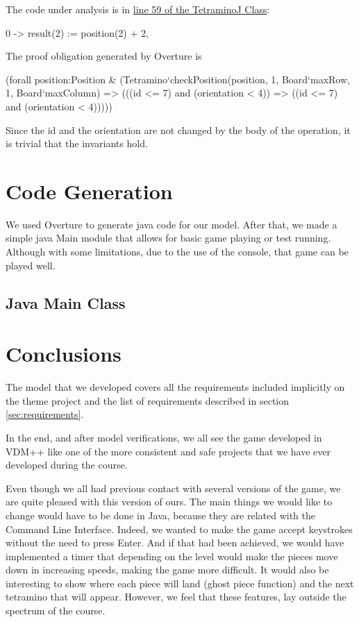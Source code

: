 \documentclass[a4paper]{article}
\begin{document}
The code under analysis is in \hyperref[getRotatedMino:55]{line 59 of the TetraminoJ Class}:
\begin{vdmpp}
	0 -> result(2) := position(2) + 2,
\end{vdmpp}

The proof obligation generated by Overture is
\begin{vdmpp}
	(forall position:Position 
		& (Tetramino`checkPosition(position, 1, Board`maxRow, 1, Board`maxColumn) 
			=> (((id <= 7) and (orientation < 4)) 
				=> ((id <= 7) and (orientation < 4)))))
\end{vdmpp}

Since the id and the orientation are not changed by the body of the operation, it is trivial that the invariants hold.

\section{Code Generation}

We used Overture to generate java code for our model. After that, we made a simple java Main module that allows for basic game playing or test running. Although with some limitations, due to the use of the console, that game can be played well.

\subsection{Java Main Class}



\section{Conclusions} 

The model that we developed covers all the requirements included implicitly on the theme project and the list of requirements described in section \ref{sec:requirements}.

In the end, and after model verifications, we all see the game developed in VDM++ like one of the more consistent and safe projects that we have ever developed during the course.

Even though we all had previous contact with several versions of the game, we are quite pleased with this version of ours. The main things we would like to change would have to be done in Java, because they are related with the Command Line Interface. Indeed, we wanted to make the game accept keystrokes without the need to press Enter. And if that had been achieved, we would have implemented a timer that depending on the level would make the pieces move down in increasing speeds, making the game more difficult. It would also be interesting to show where each piece will land (ghost piece function) and the next tetramino that will appear. However, we feel that these features, lay outside the spectrum of the course.
\end{document}
